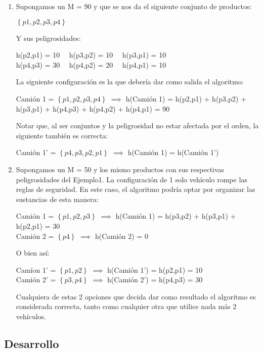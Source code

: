 \begin{enumerate}[leftmargin=0.5cm]

\item Supongamos un M = 90 y que se nos da el siguiente conjunto de productos:

$\left\{ {p1, p2, p3, p4}\right\}$

\noindent Y sus peligrosidades:

h(p2,p1) = 10 \ \ h(p3,p2) = 10 \ \ h(p3,p1) = 10\\
h(p4,p3) = 30 \ \ h(p4,p2) = 20 \ \ h(p4,p1) = 10

\noindent La siguiente configuración es la que debería dar como salida el algoritmo:

Camión 1 = $\left\{ {p1, p2, p3, p4}\right\}$ $\implies$ \newline
\indent h(Camión 1) = h(p2,p1) + h(p3,p2) + h(p3,p1) + h(p4,p3) + h(p4,p2) + h(p4,p1) = 90

\noindent Notar que, al ser conjuntos y la peligrosidad no estar afectada por el orden, la siguiente también es correcta:

Camión 1' = $\left\{ {p4, p3, p2, p1}\right\}$ $\implies$ h(Camión 1) = h(Camión 1')
\bigskip
\item Supongamos un M = 50 y los mismo productos con sus respectivas peligrosidades del Ejemplo1. La configuración de 1 solo vehículo rompe las reglas de seguridad. En este caso, el algoritmo podría optar por organizar las sustancias de esta manera:

Camión 1 = $\left\{{p1,p2,p3} \right\}$ $\implies$ h(Camión 1) = h(p3,p2) + h(p3,p1) + h(p2,p1) = 30\\ 
\indent Camión 2 = $\left\{{p4} \right\}$ $\implies$ h(Camión 2) = 0

\noindent O bien así:

Camíon 1' = $\left\{{p1,p2} \right\}$ $\implies$ h(Camión 1') = h(p2,p1) = 10\\
\indent Camión 2' = $\left\{{p3,p4} \right\}$ $\implies$ h(Camión 2') = h(p4,p3) = 30

\noindent Cualquiera de estas 2 opciones que decida dar como resultado el algoritmo es considerada correcta, tanto como cualquier otra que utilice nada más 2 vehículos.

\end{enumerate}
\newpage
\subsection{Desarrollo}

